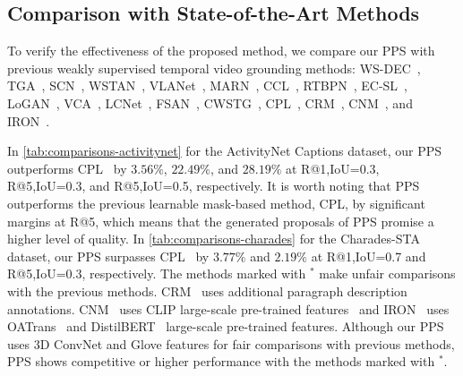 \subsection{Comparison with State-of-the-Art Methods}
\label{sec:comparison-with-state-of-the-art-methods}
To verify the effectiveness of the proposed method, we compare our PPS with previous weakly supervised temporal video grounding methods:
WS-DEC~\cite{duan2018weakly},
TGA~\cite{mithun2019weakly},
SCN~\cite{lin2020weakly},
WSTAN~\cite{wang2021weakly},
VLANet~\cite{ma2020vlanet},
MARN~\cite{song2020weakly},
CCL~\cite{zhang2020counterfactual},
RTBPN~\cite{zhang2020regularized},
EC-SL~\cite{chen2021towards},
LoGAN~\cite{tan2021logan},
VCA~\cite{wang2021visual},
LCNet~\cite{yang2021local},
FSAN~\cite{wang2022fine},
CWSTG~\cite{Chen_Luo_Zhang_Ma_2022},
CPL~\cite{zheng2022cpl},
CRM~\cite{huang2021cross},
CNM~\cite{zheng2022cnm}, and
IRON~\cite{cao2023iterative}.

In \cref{tab:comparisons-activitynet} for the ActivityNet Captions dataset, our PPS outperforms CPL~\cite{zheng2022cpl} by $3.56\%$, $22.49\%$, and $28.19\%$ at R@1,IoU=0.3, R@5,IoU=0.3, and R@5,IoU=0.5, respectively.
It is worth noting that PPS outperforms the previous learnable mask-based method, CPL, by significant margins at R@5, which means that the generated proposals of PPS promise a higher level of quality.
In \cref{tab:comparisons-charades} for the Charades-STA dataset, our PPS surpasses CPL~\cite{zheng2022cpl} by $3.77\%$ and $2.19\%$ at R@1,IoU=0.7 and R@5,IoU=0.3, respectively.
The methods marked with $^*$ make unfair comparisons with the previous methods.
CRM~\cite{huang2021cross} uses additional paragraph description annotations. CNM~\cite{zheng2022cnm} uses CLIP large-scale pre-trained features~\cite{radford2021learning} and IRON~\cite{cao2023iterative} uses OATrans~\cite{wang2022object} and DistilBERT~\cite{sanh2019distilbert} large-scale pre-trained features.
Although our PPS uses 3D ConvNet and Glove features for fair comparisons with previous methods, PPS shows competitive or higher performance with the methods marked with $^*$.

